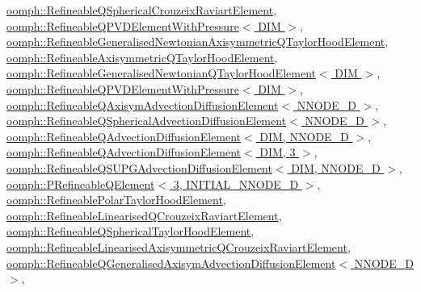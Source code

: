 \hyperlink{classoomph_1_1RefineableQSphericalCrouzeixRaviartElement_a956defebeb39dd292746c03b935e92b3}{oomph\+::\+Refineable\+Q\+Spherical\+Crouzeix\+Raviart\+Element}, \hyperlink{classoomph_1_1RefineableQPVDElementWithPressure_ad001c7401c2f62c377926870eb01f3e3}{oomph\+::\+Refineable\+Q\+P\+V\+D\+Element\+With\+Pressure$<$ D\+I\+M $>$}, \hyperlink{classoomph_1_1RefineableGeneralisedNewtonianAxisymmetricQTaylorHoodElement_ac380d6d9f19c115743fd5234ab5b8b6c}{oomph\+::\+Refineable\+Generalised\+Newtonian\+Axisymmetric\+Q\+Taylor\+Hood\+Element}, \hyperlink{classoomph_1_1RefineableAxisymmetricQTaylorHoodElement_a72b408f405d92ec892af7c0d74e913a7}{oomph\+::\+Refineable\+Axisymmetric\+Q\+Taylor\+Hood\+Element}, \hyperlink{classoomph_1_1RefineableGeneralisedNewtonianQTaylorHoodElement_a356391ebd65c493cc40bf1df0749047a}{oomph\+::\+Refineable\+Generalised\+Newtonian\+Q\+Taylor\+Hood\+Element$<$ D\+I\+M $>$}, \hyperlink{classoomph_1_1RefineableQPVDElementWithPressure_ad3d90fabb0a853d969b8b3a0115bcabc}{oomph\+::\+Refineable\+Q\+P\+V\+D\+Element\+With\+Pressure$<$ D\+I\+M $>$}, \hyperlink{classoomph_1_1RefineableQAxisymAdvectionDiffusionElement_a076995e66fdcc001c2b664309a6f7b46}{oomph\+::\+Refineable\+Q\+Axisym\+Advection\+Diffusion\+Element$<$ N\+N\+O\+D\+E\+\_\+D $>$}, \hyperlink{classoomph_1_1RefineableQSphericalAdvectionDiffusionElement_a8c2063c57db484970fcb35b220f7043e}{oomph\+::\+Refineable\+Q\+Spherical\+Advection\+Diffusion\+Element$<$ N\+N\+O\+D\+E\+\_\+D $>$}, \hyperlink{classoomph_1_1RefineableQAdvectionDiffusionElement_ad2a59ed27f0ef1509a797a4ad97121c9}{oomph\+::\+Refineable\+Q\+Advection\+Diffusion\+Element$<$ D\+I\+M, N\+N\+O\+D\+E\+\_\+D $>$}, \hyperlink{classoomph_1_1RefineableQAdvectionDiffusionElement_ad2a59ed27f0ef1509a797a4ad97121c9}{oomph\+::\+Refineable\+Q\+Advection\+Diffusion\+Element$<$ D\+I\+M, 3 $>$}, \hyperlink{classoomph_1_1RefineableQSUPGAdvectionDiffusionElement_a084f176c97f1f8d024c7c2025e60cec9}{oomph\+::\+Refineable\+Q\+S\+U\+P\+G\+Advection\+Diffusion\+Element$<$ D\+I\+M, N\+N\+O\+D\+E\+\_\+D $>$}, \hyperlink{classoomph_1_1PRefineableQElement_3_013_00_01INITIAL__NNODE__1D_01_4_ae4014ced0f6a6cdb14b9ae53efcd5fb8}{oomph\+::\+P\+Refineable\+Q\+Element$<$ 3, I\+N\+I\+T\+I\+A\+L\+\_\+\+N\+N\+O\+D\+E\+\_\+D $>$}, \hyperlink{classoomph_1_1RefineablePolarTaylorHoodElement_a0ef3766f870b55585a8de7c0cc32a1dd}{oomph\+::\+Refineable\+Polar\+Taylor\+Hood\+Element}, \hyperlink{classoomph_1_1RefineableLinearisedQCrouzeixRaviartElement_a99ad7d880546a5df9cc502c7fbe9c24b}{oomph\+::\+Refineable\+Linearised\+Q\+Crouzeix\+Raviart\+Element}, \hyperlink{classoomph_1_1RefineableQSphericalTaylorHoodElement_a52c98dc0cc33e2e756ca2873639d641b}{oomph\+::\+Refineable\+Q\+Spherical\+Taylor\+Hood\+Element}, \hyperlink{classoomph_1_1RefineableLinearisedAxisymmetricQCrouzeixRaviartElement_ad5593154711ea93a299b3c9b8d32cb5f}{oomph\+::\+Refineable\+Linearised\+Axisymmetric\+Q\+Crouzeix\+Raviart\+Element}, \hyperlink{classoomph_1_1RefineableQGeneralisedAxisymAdvectionDiffusionElement_aad29ba9341305fbb451f3825aa3f8d03}{oomph\+::\+Refineable\+Q\+Generalised\+Axisym\+Advection\+Diffusion\+Element$<$ N\+N\+O\+D\+E\+\_\+D $>$}, 
